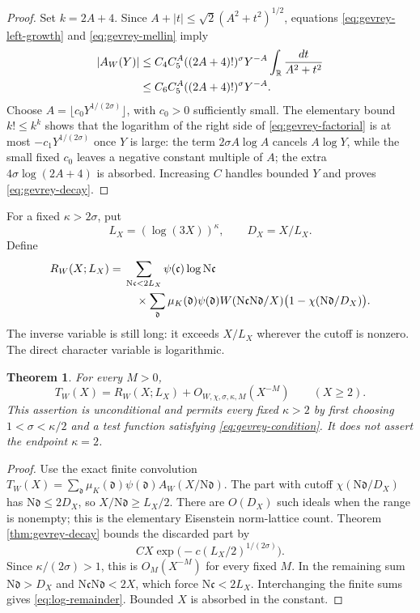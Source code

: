 \documentclass[11pt]{article}
\newtheorem{theorem}{Theorem}[section]
\newcommand{\N}{\mathrm N}
\begin{document}
\begin{proof}
Set $k=2A+4$. Since $A+|t|\le\sqrt2(A^2+t^2)^{1/2}$, equations
\eqref{eq:gevrey-left-growth} and \eqref{eq:gevrey-mellin} imply
\begin{align}
 |A_W(Y)|
 &\le C_4 C_5^A((2A+4)!)^\sigma Y^{-A}
          \int_{\mathbb R}\frac{dt}{A^2+t^2}\notag\\
 &\le C_6 C_5^A((2A+4)!)^\sigma Y^{-A}.
                                                        \label{eq:gevrey-factorial}
\end{align}
Choose $A=\lfloor c_0Y^{1/(2\sigma)}\rfloor$, with $c_0>0$
sufficiently small. The elementary bound $k!\le k^k$ shows that
the logarithm of the right side of \eqref{eq:gevrey-factorial}
is at most $-c_1Y^{1/(2\sigma)}$ once $Y$ is large: the term
$2\sigma A\log A$ cancels $A\log Y$, while the small fixed
$c_0$ leaves a negative constant multiple of $A$; the extra
$4\sigma\log(2A+4)$ is absorbed. Increasing $C$ handles bounded
$Y$ and proves \eqref{eq:gevrey-decay}.
\end{proof}

For a fixed $\kappa>2\sigma$, put
\[
 L_X=(\log(3X))^\kappa,\qquad D_X=X/L_X.
\]
Define
\begin{align}
 R_W(X;L_X)
 ={}&\sum_{\N\mathfrak c<2L_X}
       \psi(\mathfrak c)\log\N\mathfrak c\notag\\
 &\quad\times\sum_{\mathfrak d}\mu_K(\mathfrak d)\psi(\mathfrak d)
       W(\N\mathfrak c\N\mathfrak d/X)
       \bigl(1-\chi(\N\mathfrak d/D_X)\bigr).
                                                       \label{eq:log-remainder}
\end{align}
The inverse variable is still long: it exceeds $X/L_X$ wherever
the cutoff is nonzero. The direct character variable is logarithmic.

\begin{theorem}\label{thm:log-cutoff}
For every $M>0$,
\begin{equation}\label{eq:log-cutoff}
 T_W(X)=R_W(X;L_X)+O_{W,\chi,\sigma,\kappa,M}(X^{-M})
 \qquad(X\ge2).
\end{equation}
This assertion is unconditional and permits every fixed $\kappa>2$
by first choosing $1<\sigma<\kappa/2$ and a test function satisfying
\eqref{eq:gevrey-condition}. It does not assert the endpoint
$\kappa=2$.
\end{theorem}

\begin{proof}
Use the exact finite convolution
$T_W(X)=\sum_{\mathfrak d}\mu_K(\mathfrak d)\psi(\mathfrak d)
A_W(X/\N\mathfrak d)$.
The part with cutoff $\chi(\N\mathfrak d/D_X)$ has
$\N\mathfrak d\le2D_X$, so $X/\N\mathfrak d\ge L_X/2$.
There are $O(D_X)$ such ideals when the range is nonempty;
this is the elementary Eisenstein norm-lattice count. Theorem
\ref{thm:gevrey-decay} bounds the discarded part by
\[
 C X\exp\bigl(-c(L_X/2)^{1/(2\sigma)}\bigr).
\]
Since $\kappa/(2\sigma)>1$, this is $O_M(X^{-M})$ for every
fixed $M$. In the remaining sum $\N\mathfrak d>D_X$ and
$\N\mathfrak c\N\mathfrak d<2X$, which force
$\N\mathfrak c<2L_X$. Interchanging the finite sums gives
\eqref{eq:log-remainder}. Bounded $X$ is absorbed in the constant.
\end{proof}
\end{document}
